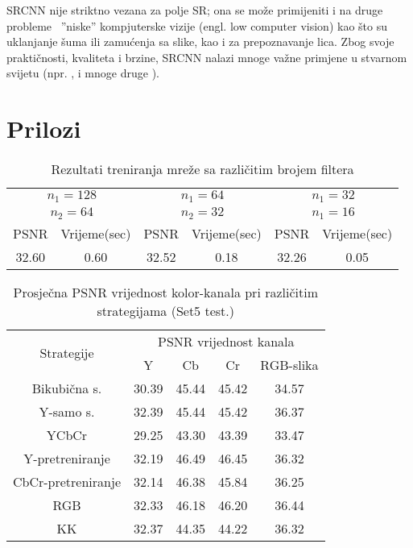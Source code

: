 \documentclass[12pt]{report}
\numberwithin{equation}{section}
\begin{document}
  SRCNN nije striktno vezana za polje SR; ona se može primijeniti i na druge probleme \  ''niske'' kompjuterske vizije (engl. low computer vision) kao što su uklanjanje šuma ili zamućenja sa slike, kao i za prepoznavanje lica. Zbog svoje praktičnosti, kvaliteta i brzine, SRCNN nalazi mnoge važne primjene u stvarnom svijetu (npr. \cite{primjena}, i mnoge druge \cite{files}).
     
   

\chapter{Prilozi}



\begin{table}[h!]
\centering
\begin{tabular}{ |c|c|c|c|c|c| } 
\hline
\multicolumn{2}{|c|}{$n_1=128$} & \multicolumn{2}{|c|}{$n_1=64$} & \multicolumn{2}{|c|}{$n_1=32$} \\
\multicolumn{2}{|c|}{$n_2=64$} & \multicolumn{2}{|c|}{$n_2=32$} & \multicolumn{2}{|c|}{$n_1=16$} \\
\hline
PSNR & Vrijeme(sec) & PSNR & Vrijeme(sec) & PSNR & Vrijeme(sec) \\
\hline
32.60 & 0.60 & 32.52 & 0.18 & 32.26 & 0.05 \\
\hline
\end{tabular}
\caption{Rezultati treniranja mreže sa različitim brojem filtera}
\label{table:1}
\end{table}



\begin{table}[h!]
\centering
\begin{tabular}{ |c|c|c|c|c| } 
\hline
\multirow{2}{*}{Strategije}&\multicolumn{4}{|c|}{PSNR vrijednost kanala}\\
\cline{2-5}
&Y & Cb & Cr & RGB-slika\\ 
\hline
Bikubična s. & 30.39 & 45.44 & 45.42 & 34.57 \\
Y-samo s. & 32.39 & 45.44 & 45.42 & 36.37 \\
YCbCr & 29.25 & 43.30 & 43.39 & 33.47 \\
Y-pretreniranje & 32.19 & 46.49 & 46.45 & 36.32 \\
CbCr-pretreniranje & 32.14 & 46.38 & 45.84 & 36.25 \\
RGB & 32.33 & 46.18 & 46.20 & 36.44 \\
KK & 32.37 & 44.35 & 44.22 & 36.32 \\
\hline
\end{tabular}
\caption{Prosječna PSNR vrijednost kolor-kanala pri različitim strategijama (Set5 test.)}
\label{table:2}
\end{table}
\end{document}
